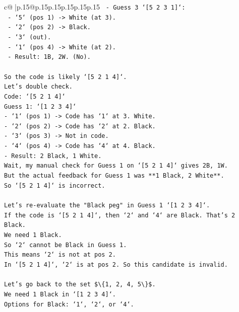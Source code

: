 \documentclass{article}
\begin{document}
{\begin{supertabular}{c@{$\;$}|p{.15\linewidth}@{}p{.15\linewidth}p{.15\linewidth}p{.15\linewidth}p{.15\linewidth}p{.15\linewidth}}
{{{\texttt{       {-} Guess 3 `{[}5 2 3 1{]}`:} \\
\texttt{         {-} `5` (pos 1) {-}> White (at 3).} \\
\texttt{         {-} `2` (pos 2) {-}> Black.} \\
\texttt{         {-} `3` (out).} \\
\texttt{         {-} `1` (pos 4) {-}> White (at 2).} \\
\texttt{         {-} Result: 1B, 2W. (No).} \\
\\ 
\texttt{So the code is likely `{[}5 2 1 4{]}`.} \\
\texttt{Let's double check.} \\
\texttt{Code: `{[}5 2 1 4{]}`} \\
\texttt{Guess 1: `{[}1 2 3 4{]}`} \\
\texttt{{-} `1` (pos 1) {-}> Code has `1` at 3. White.} \\
\texttt{{-} `2` (pos 2) {-}> Code has `2` at 2. Black.} \\
\texttt{{-} `3` (pos 3) {-}> Not in code.} \\
\texttt{{-} `4` (pos 4) {-}> Code has `4` at 4. Black.} \\
\texttt{{-} Result: 2 Black, 1 White.} \\
\texttt{Wait, my manual check for Guess 1 on `{[}5 2 1 4{]}` gives 2B, 1W.} \\
\texttt{But the actual feedback for Guess 1 was **1 Black, 2 White**.} \\
\texttt{So `{[}5 2 1 4{]}` is incorrect.} \\
\\ 
\texttt{Let's re{-}evaluate the "Black peg" in Guess 1 `{[}1 2 3 4{]}`.} \\
\texttt{If the code is `{[}5 2 1 4{]}`, then `2` and `4` are Black. That's 2 Black.} \\
\texttt{We need 1 Black.} \\
\texttt{So `2` cannot be Black in Guess 1.} \\
\texttt{This means `2` is not at pos 2.} \\
\texttt{In `{[}5 2 1 4{]}`, `2` is at pos 2. So this candidate is invalid.} \\
\\ 
\texttt{Let's go back to the set \$\textbackslash{}\{1, 2, 4, 5\textbackslash{}\}\$.} \\
\texttt{We need 1 Black in `{[}1 2 3 4{]}`.} \\
\texttt{Options for Black: `1`, `2`, or `4`.} \\
}}}
\end{supertabular}}
\end{document}

